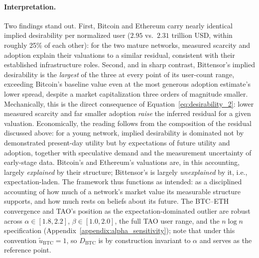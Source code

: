\documentclass[12pt]{article}
\begin{document}
\paragraph{Interpretation.}
Two findings stand out. First, Bitcoin and Ethereum carry nearly identical implied desirability per normalized user (\(2.95\) vs.\ \(2.31\) trillion USD, within roughly 25\% of each other): for the two mature networks, measured scarcity and adoption explain their valuations to a similar residual, consistent with their established infrastructure roles. Second, and in sharp contrast, Bittensor's implied desirability is the \emph{largest} of the three at every point of its user-count range, exceeding Bitcoin's baseline value even at the most generous adoption estimate's lower spread, despite a market capitalization three orders of magnitude smaller. Mechanically, this is the direct consequence of Equation~\eqref{eq:desirability_2}: lower measured scarcity and far smaller adoption \emph{raise} the inferred residual for a given valuation. Economically, the reading follows from the composition of the residual discussed above: for a young network, implied desirability is dominated not by demonstrated present-day utility but by expectations of future utility and adoption, together with speculative demand and the measurement uncertainty of early-stage data. Bitcoin's and Ethereum's valuations are, in this accounting, largely \emph{explained} by their structure; Bittensor's is largely \emph{unexplained} by it, i.e., expectation-laden. The framework thus functions as intended: as a disciplined accounting of how much of a network's market value its measurable structure supports, and how much rests on beliefs about its future. The BTC--ETH convergence and TAO's position as the expectation-dominated outlier are robust across \(\alpha \in [1.8, 2.2]\), \(\beta \in [1.0, 2.0]\), the full TAO user range, and the \( n \log n \) specification (Appendix~\ref{appendix:alpha_sensitivity}); note that under this convention \( \tilde{u}_{\text{BTC}} = 1 \), so \( D_{\text{BTC}} \) is by construction invariant to \(\alpha\) and serves as the reference point.
\end{document}
